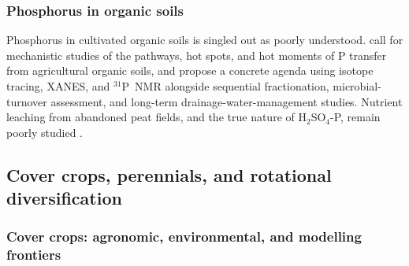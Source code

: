 \subsubsection{Phosphorus in organic soils}

Phosphorus in cultivated organic soils is singled out as poorly understood.
\textcite{Grenon2022} call for mechanistic studies of the pathways, hot spots,
and hot moments of P transfer from agricultural organic soils, and
\textcite{Grenon2021} propose a concrete agenda using isotope tracing, XANES,
and $^{31}$P~NMR alongside sequential fractionation, microbial-turnover
assessment, and long-term drainage-water-management studies. Nutrient leaching
from abandoned peat fields, and the true nature of H$_2$SO$_4$-P, remain poorly
studied \parencite{Höyhtyä2025}.

\subsection{Cover crops, perennials, and rotational diversification}

\subsubsection{Cover crops: agronomic, environmental, and modelling frontiers}

